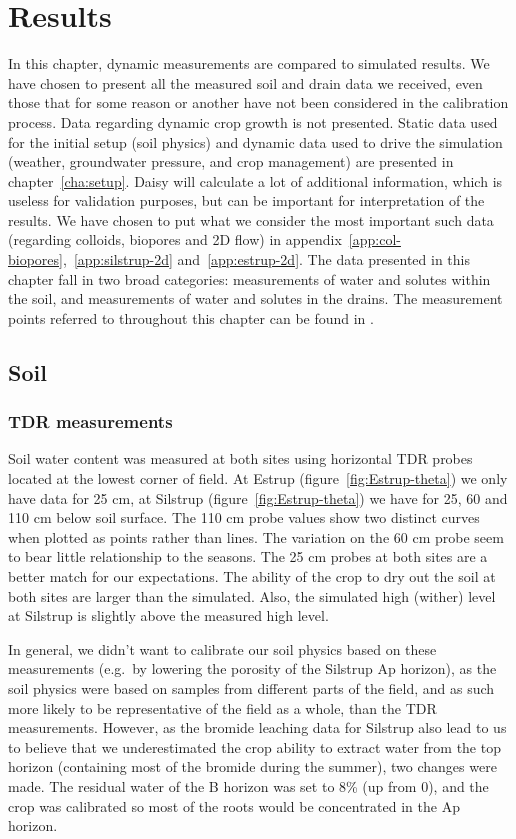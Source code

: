 \chapter{Results}

In this chapter, dynamic measurements are compared to simulated
results.  We have chosen to present all the measured soil and drain
data we received, even those that for some reason or another have not
been considered in the calibration process.  Data regarding dynamic
crop growth is not presented.  Static data used for the initial setup
(soil physics) and dynamic data used to drive the simulation (weather,
groundwater pressure, and crop management) are presented in
chapter~\ref{cha:setup}.  Daisy will calculate a lot of additional
information, which is useless for validation purposes, but can be
important for interpretation of the results.  We have chosen to put
what we consider the most important such data (regarding colloids,
biopores and 2D flow) in
appendix~\ref{app:col-biopores},~\ref{app:silstrup-2d}
and~\ref{app:estrup-2d}.  The data presented in this chapter fall in
two broad categories: measurements of water and solutes within the
soil, and measurements of water and solutes in the drains.  The
measurement points referred to throughout this chapter can be found in
\citet{vap2009}.

\section{Soil}

\subsection{TDR measurements}

Soil water content was measured at both sites using horizontal TDR
probes located at the lowest corner of field.  At Estrup
(figure~\ref{fig:Estrup-theta}) we only have data for 25 cm, at
Silstrup (figure~\ref{fig:Estrup-theta}) we have for 25, 60 and 110 cm
below soil surface.  The 110 cm probe values show two distinct curves
when plotted as points rather than lines.  The variation on the 60 cm
probe seem to bear little relationship to the seasons.  The 25 cm
probes at both sites are a better match for our expectations.  The
ability of the crop to dry out the soil at both sites are larger than
the simulated.  Also, the simulated high (wither) level at Silstrup is
slightly above the measured high level.

In general, we didn't want to calibrate our soil physics based on
these measurements (e.g.\ by lowering the porosity of the Silstrup Ap
horizon), as the soil physics were based on samples from different
parts of the field, and as such more likely to be representative of
the field as a whole, than the TDR measurements.  However, as the
bromide leaching data for Silstrup also lead to us to believe that we
underestimated the crop ability to extract water from the top horizon
(containing most of the bromide during the summer), two changes were
made.  The residual water of the B horizon was set to 8\% (up from 0),
and the crop was calibrated so most of the roots would be concentrated
in the Ap horizon.

